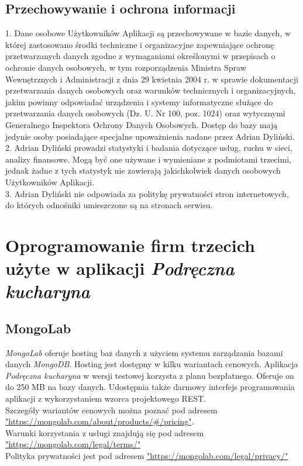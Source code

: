 \documentclass[12pt,leqno, twoside]{mwart}
\begin{document}
\subsection{Przechowywanie i ochrona informacji}

1. Dane osobowe Użytkowników Aplikacji są przechowywane w bazie danych, w której zastosowano środki techniczne i organizacyjne zapewniające ochronę przetwarzanych danych zgodne z wymaganiami określonymi w przepisach o ochronie danych osobowych, w tym rozporządzenia Ministra Spraw Wewnętrznych i Administracji z dnia 29 kwietnia 2004 r. w sprawie dokumentacji przetwarzania danych osobowych oraz warunków technicznych i organizacyjnych, jakim powinny odpowiadać urządzenia i systemy informatyczne służące do przetwarzania danych osobowych (Dz. U. Nr 100, poz. 1024) oraz wytycznymi Generalnego Inspektora Ochrony Danych Osobowych. Dostęp do bazy mają jedynie osoby posiadające specjalne upoważnienia nadane przez Adrian Dyliński. \\
2. Adrian Dyliński prowadzi statystyki i badania dotyczące usług, ruchu w sieci, analizy finansowe. Mogą być one używane i wymieniane z podmiotami trzecimi, jednak żadne z tych statystyk nie zawierają jakichkolwiek danych osobowych Użytkowników Aplikacji. \\
3. Adrian Dyliński nie odpowiada za politykę prywatności stron internetowych, do których odnośniki umieszczone są na stronach serwisu.

\section{Oprogramowanie firm trzecich użyte w aplikacji \emph{Podręczna kucharyna} }
\subsection{MongoLab}
\emph{MongoLab} oferuje hosting baz danych z użyciem systemu zarządzania bazami danych \emph{MongoDB}.
Hosting jest dostępny w kilku wariantach cenowych.
Aplikacja \emph{Podręczna kucharyna} w wersji testowej korzysta z planu bezpłatnego.
Oferuje on do 250 MB na bazy danych.
Udostępnia także darmowy interfejs programowania aplikacji z wykorzystaniem wzorca projektowego REST. \\
Szczegóły wariantów cenowych można poznać pod adresem \url{"https://mongolab.com/about/products/#/pricing"}. \\
Warunki korzystania z usługi znajdują się pod adresem \url{"https://mongolab.com/legal/terms/"}\\
Polityka prywatności jest pod adresem \url{"https://mongolab.com/legal/privacy/"}
\end{document}
